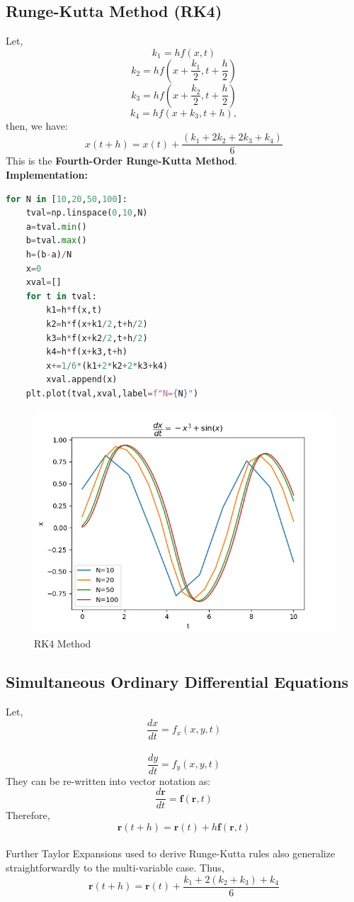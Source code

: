 \subsection{Runge-Kutta Method (RK4)}
Let,
$$k_{1}=hf(x,t)$$$$k_{2}=hf(x+\dfrac{k_{1}}{2}, t+\dfrac{h}{2})$$$$k_{3}=hf(x+\dfrac{k_{2}}{2}, t+\dfrac{h}{2})$$$$k_{4}=hf(x+k_{3}, t+h),$$then, we have:
$$x(t+h)=x(t)+\dfrac{(k_{1}+2k_{2}+2k_{3}+k_{4})}{6}$$
This is the \textbf{Fourth-Order Runge-Kutta Method}. \\
\textbf{Implementation:}
\begin{lstlisting}[language=Python, caption=RK4 Method, frame=single, label={lst:RK4} ]
for N in [10,20,50,100]:
	tval=np.linspace(0,10,N)
	a=tval.min()
	b=tval.max()
	h=(b-a)/N
	x=0
	xval=[]
	for t in tval:
		k1=h*f(x,t)
		k2=h*f(x+k1/2,t+h/2)
		k3=h*f(x+k2/2,t+h/2)
		k4=h*f(x+k3,t+h)
		x+=1/6*(k1+2*k2+2*k3+k4)
		xval.append(x)
	plt.plot(tval,xval,label=f"N={N}")

\end{lstlisting}
\begin{figure}[H]
	\centering
	\includegraphics[width=0.7\linewidth]{RK4}
	\caption{RK4 Method}
	\label{fig:rk4}
\end{figure}

\subsection{Simultaneous Ordinary Differential Equations}
Let,$$\dfrac{dx}{dt}=f_{x}(x,y,t)$$\\ $$\dfrac{dy}{dt}=f_{y}(x,y,t)$$They can be re-written into vector notation as: $$\dfrac{d\textbf{r}}{dt}=\textbf{f}(\textbf{r}, t)$$ Therefore,$$\textbf{r}(t+h)=\textbf{r}(t)+h\textbf{f}(\textbf{r},t)$$ \\
Further Taylor Expansions used to derive Runge-Kutta rules also generalize straightforwardly to the multi-variable case. Thus, $$\textbf{r}(t+h)=\textbf{r}(t)+\dfrac{\textbf{$k_{1}$}+2(\textbf{$k_{2}+k_{3}$})+k_{4}}{6}$$
